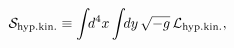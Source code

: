 \begin{equation}
  {\cal S}_{\rm hyp.kin.} 
    \equiv \int\!\!d^4x \int\!\!dy \, \sqrt{-g} \, {\cal L}_{\rm hyp.kin.},
\label{eq:def-s}
\end{equation}

